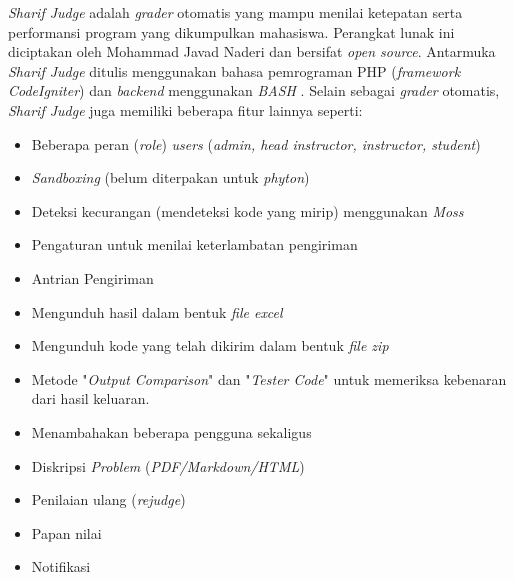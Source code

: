\textit{Sharif Judge} adalah \textit{grader} otomatis yang mampu menilai ketepatan serta performansi program yang dikumpulkan mahasiswa. Perangkat lunak ini diciptakan oleh Mohammad Javad Naderi dan bersifat \textit{open source}. Antarmuka \textit{Sharif Judge} ditulis menggunakan bahasa pemrograman PHP (\textit{framework CodeIgniter}) dan \textit{backend} menggunakan \textit{BASH} \cite{mjnaderi:14:sharifjudge}.
Selain sebagai \textit{grader} otomatis, \textit{Sharif Judge} juga memiliki beberapa fitur lainnya seperti:
\begin{itemize}
	\item Beberapa peran (\textit{role}) \textit{users} (\textit{admin, head instructor, instructor, student})
	\item \textit{Sandboxing} (belum diterpakan untuk \textit{phyton})
	\item Deteksi kecurangan (mendeteksi kode yang mirip) menggunakan \textit{Moss}
	\item Pengaturan untuk menilai keterlambatan pengiriman
	\item Antrian Pengiriman
	\item Mengunduh hasil dalam bentuk \textit{file excel}
	\item Mengunduh kode yang telah dikirim dalam bentuk \textit{file zip}
	\item Metode "\textit{Output Comparison}" dan "\textit{Tester Code}" untuk memeriksa kebenaran dari hasil keluaran.
	\item Menambahakan beberapa pengguna sekaligus
	\item Diskripsi \textit{Problem} (\textit{PDF/Markdown/HTML})
	\item Penilaian ulang (\textit{rejudge})
	\item Papan nilai
	\item Notifikasi
\end{itemize}

